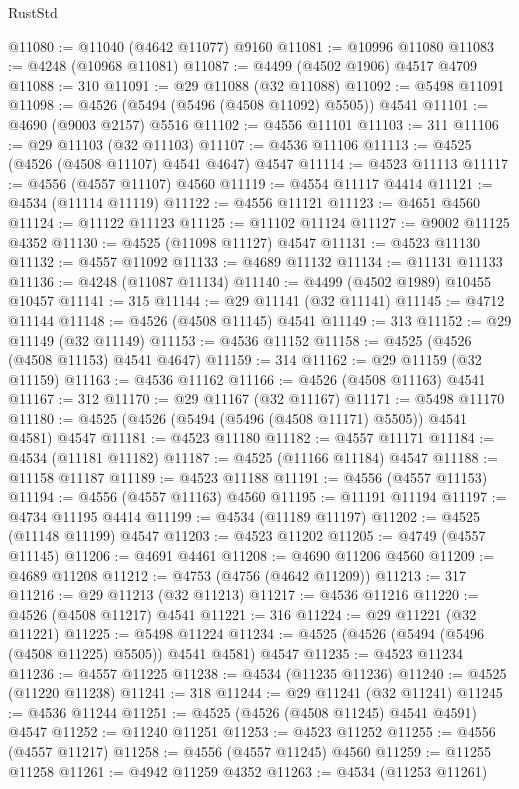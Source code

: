 \begin{lexlean}{RustStd}
\begin{coremodule}
{\begin{coremodule}
{{{{{{{{{{{{{{{{{{{{{{{{{{{{{{{{{{{{{{{{{{{{{{{{{{{{{{{@11080 := @11040 (@4642 @11077) @9160
@11081 := @10996 @11080
@11083 := @4248 (@10968 @11081)
@11087 := @4499 (@4502 @1906) @4517 @4709
@11088 := 310
@11091 := @29 @11088 (@32 @11088)
@11092 := @5498 @11091
@11098 := @4526 (@5494 (@5496 (@4508 @11092) @5505)) @4541
@11101 := @4690 (@9003 @2157) @5516
@11102 := @4556 @11101
@11103 := 311
@11106 := @29 @11103 (@32 @11103)
@11107 := @4536 @11106
@11113 := @4525 (@4526 (@4508 @11107) @4541 @4647) @4547
@11114 := @4523 @11113
@11117 := @4556 (@4557 @11107) @4560
@11119 := @4554 @11117 @4414
@11121 := @4534 (@11114 @11119)
@11122 := @4556 @11121
@11123 := @4651 @4560
@11124 := @11122 @11123
@11125 := @11102 @11124
@11127 := @9002 @11125 @4352
@11130 := @4525 (@11098 @11127) @4547
@11131 := @4523 @11130
@11132 := @4557 @11092
@11133 := @4689 @11132
@11134 := @11131 @11133
@11136 := @4248 (@11087 @11134)
@11140 := @4499 (@4502 @1989) @10455 @10457
@11141 := 315
@11144 := @29 @11141 (@32 @11141)
@11145 := @4712 @11144
@11148 := @4526 (@4508 @11145) @4541
@11149 := 313
@11152 := @29 @11149 (@32 @11149)
@11153 := @4536 @11152
@11158 := @4525 (@4526 (@4508 @11153) @4541 @4647)
@11159 := 314
@11162 := @29 @11159 (@32 @11159)
@11163 := @4536 @11162
@11166 := @4526 (@4508 @11163) @4541
@11167 := 312
@11170 := @29 @11167 (@32 @11167)
@11171 := @5498 @11170
@11180 := @4525 (@4526 (@5494 (@5496 (@4508 @11171) @5505)) @4541 @4581) @4547
@11181 := @4523 @11180
@11182 := @4557 @11171
@11184 := @4534 (@11181 @11182)
@11187 := @4525 (@11166 @11184) @4547
@11188 := @11158 @11187
@11189 := @4523 @11188
@11191 := @4556 (@4557 @11153)
@11194 := @4556 (@4557 @11163) @4560
@11195 := @11191 @11194
@11197 := @4734 @11195 @4414
@11199 := @4534 (@11189 @11197)
@11202 := @4525 (@11148 @11199) @4547
@11203 := @4523 @11202
@11205 := @4749 (@4557 @11145)
@11206 := @4691 @4461
@11208 := @4690 @11206 @4560
@11209 := @4689 @11208
@11212 := @4753 (@4756 (@4642 @11209))
@11213 := 317
@11216 := @29 @11213 (@32 @11213)
@11217 := @4536 @11216
@11220 := @4526 (@4508 @11217) @4541
@11221 := 316
@11224 := @29 @11221 (@32 @11221)
@11225 := @5498 @11224
@11234 := @4525 (@4526 (@5494 (@5496 (@4508 @11225) @5505)) @4541 @4581) @4547
@11235 := @4523 @11234
@11236 := @4557 @11225
@11238 := @4534 (@11235 @11236)
@11240 := @4525 (@11220 @11238)
@11241 := 318
@11244 := @29 @11241 (@32 @11241)
@11245 := @4536 @11244
@11251 := @4525 (@4526 (@4508 @11245) @4541 @4591) @4547
@11252 := @11240 @11251
@11253 := @4523 @11252
@11255 := @4556 (@4557 @11217)
@11258 := @4556 (@4557 @11245) @4560
@11259 := @11255 @11258
@11261 := @4942 @11259 @4352
@11263 := @4534 (@11253 @11261)
}}}}}}}}}}}}}}}}}}}}}}}}}}}}}}}}}}}}}}}}}}}}}}}}}}}}}}}
\end{coremodule}}
\end{coremodule}
\end{lexlean}
